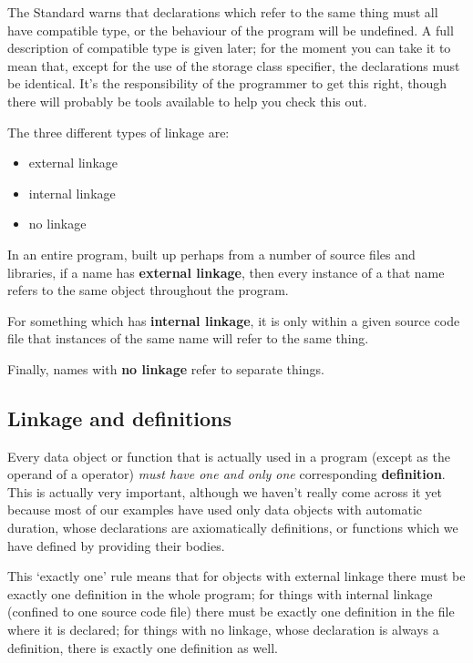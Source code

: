    The Standard warns that declarations which refer to the same thing
    must all have compatible type, or the behaviour of the program will be
    undefined. A full description of compatible type is given later; for the
    moment you can take it to mean that, except for the use of the storage
    class specifier, the declarations must be identical. It's the
    responsibility of the programmer to get this right, though there will
    probably be tools available to help you check this out.


   The three different types of linkage are:


   \begin{itemize}
    \item external linkage
    \item internal linkage
    \item no linkage
   \end{itemize}

   In an entire program, built up perhaps from a number of source files
    and libraries, if a name has \textbf{external linkage}, then every
    instance of a that name refers to the same object throughout the
    program.


   For something which has \textbf{internal linkage}, it is only within
    a given source code file that instances of the same name will refer to
    the same thing.


   Finally, names with \textbf{no linkage} refer to separate
    things.


  

  \subsection{Linkage and definitions}
   

   Every data object or function that is actually used in a program
    (except as the operand of a \sizeof{} operator) \textit{must have
    one and only one} corresponding \textbf{definition}. This is
    actually very important, although we haven't really come across it yet
    because most of our examples have used only data objects with automatic
    duration, whose declarations are axiomatically definitions, or functions
    which we have defined by providing their bodies.


   This `exactly one' rule means that for objects with external
    linkage there must be exactly one definition in the whole program; for
    things with internal linkage (confined to one source code file) there
    must be exactly one definition in the file where it is declared; for
    things with no linkage, whose declaration is always a definition, there
    is exactly one definition as well.


